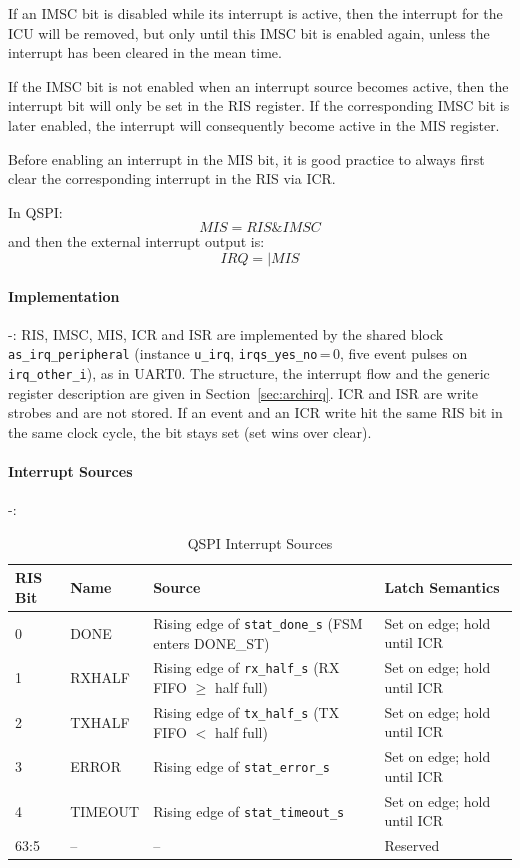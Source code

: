 If an IMSC bit is disabled while its interrupt is active, then the interrupt for the ICU will be
removed, but only until this IMSC bit is enabled again, unless the interrupt has been
cleared in the mean time.

If the IMSC bit is not enabled when an interrupt source becomes active, then the interrupt
bit will only be set in the RIS register. If the corresponding IMSC bit is later enabled, the
interrupt will consequently become active in the MIS register.

Before enabling an interrupt in the MIS bit, it is good practice to always first clear the
corresponding interrupt in the RIS via ICR.

In QSPI: \[ MIS = RIS \& IMSC \] and then the external interrupt output is: \[ IRQ =|  MIS \]

\paragraph{Implementation} -:
RIS, IMSC, MIS, ICR and ISR are implemented by the shared block
\texttt{as\_irq\_peripheral} (instance \texttt{u\_irq}, \texttt{irqs\_yes\_no}\,=\,0,
five event pulses on \texttt{irq\_other\_i}), as in UART0. The structure, the interrupt
flow and the generic register description are given in Section~\ref{sec:archirq}.
ICR and ISR are write strobes and are not stored. If an event and an ICR write hit
the same RIS bit in the same clock cycle, the bit stays set (set wins over clear).

\paragraph{Interrupt Sources} -:
\begin{table}[H]
\caption{QSPI Interrupt Sources}
\label{tab:asqspispec_irqsrc}
\centering
\begin{tabularx}{\textwidth}{|l|l|X|X|}
  \hline
  RIS Bit & Name & Source & Latch Semantics \\
  \hline\hline
  0 & DONE     & Rising edge of \texttt{stat\_done\_s} (FSM enters DONE\_ST) & Set on edge; hold until ICR \\
  \hline
  1 & RXHALF   & Rising edge of \texttt{rx\_half\_s} (RX FIFO $\geq$ half full) & Set on edge; hold until ICR \\
  \hline
  2 & TXHALF   & Rising edge of \texttt{tx\_half\_s} (TX FIFO $<$ half full)   & Set on edge; hold until ICR \\
  \hline
  3 & ERROR    & Rising edge of \texttt{stat\_error\_s}                         & Set on edge; hold until ICR \\
  \hline
  4 & TIMEOUT  & Rising edge of \texttt{stat\_timeout\_s}                       & Set on edge; hold until ICR \\
  \hline
  63:5 & --   & --                                                              & Reserved \\
  \hline
\end{tabularx}
\end{table}

